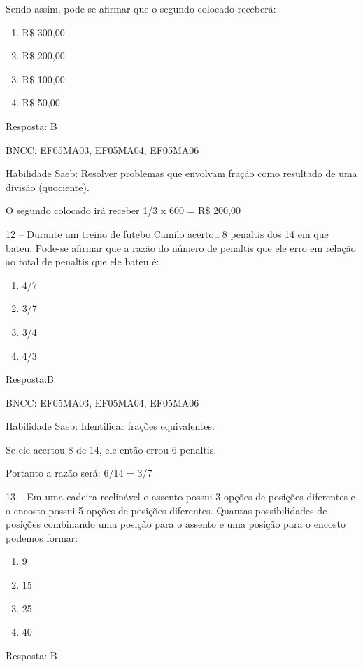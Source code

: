 Sendo assim, pode-se afirmar que o segundo colocado receberá:

\begin{enumerate}
\def\labelenumi{\alph{enumi})}
\item
  R\$ 300,00
\item
  R\$ 200,00
\item
  R\$ 100,00
\item
  R\$ 50,00
\end{enumerate}

Resposta: B

BNCC: EF05MA03, EF05MA04, EF05MA06

Habilidade Saeb: Resolver problemas que envolvam fração como resultado
de uma divisão (quociente).

O segundo colocado irá receber 1/3 x 600 = R\$ 200,00

12 -- Durante um treino de futebo Camilo acertou 8 penaltis dos 14 em
que bateu. Pode-se afirmar que a razão do número de penaltis que ele
erro em relação ao total de penaltis que ele bateu é:

\begin{enumerate}
\def\labelenumi{\alph{enumi})}
\item
  4/7
\item
  3/7
\item
  3/4
\item
  4/3
\end{enumerate}

Resposta:B

BNCC: EF05MA03, EF05MA04, EF05MA06

Habilidade Saeb: Identificar frações equivalentes.

Se ele acertou 8 de 14, ele então errou 6 penaltis.

Portanto a razão será: 6/14 = 3/7

13 -- Em uma cadeira reclinável o assento possui 3 opções de posições
diferentes e o encosto possui 5 opções de posições diferentes. Quantas
possibilidades de posições combinando uma posição para o assento e uma
posição para o encosto podemos formar:

\begin{enumerate}
\def\labelenumi{\alph{enumi})}
\item
  9
\item
  15
\item
  25
\item
  40
\end{enumerate}

Resposta: B

